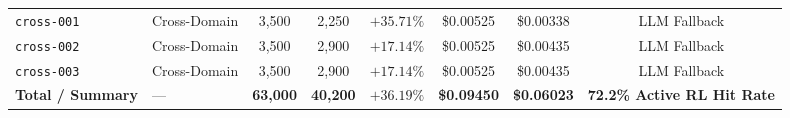 \begin{table}[!t]
\begin{tabular}{llcccccc}
\texttt{cross-001} & Cross-Domain & 3,500 & 2,250 & $+35.71\%$ & \$0.00525 & \$0.00338 & LLM Fallback \\
\texttt{cross-002} & Cross-Domain & 3,500 & 2,900 & $+17.14\%$ & \$0.00525 & \$0.00435 & LLM Fallback \\
\texttt{cross-003} & Cross-Domain & 3,500 & 2,900 & $+17.14\%$ & \$0.00525 & \$0.00435 & LLM Fallback \\
\midrule
\textbf{Total / Summary} & --- & \textbf{63,000} & \textbf{40,200} & $\mathbf{+36.19\%}$ & \textbf{\$0.09450} & \textbf{\$0.06023} & \textbf{72.2\% Active RL Hit Rate} \\
\bottomrule
\end{tabular}
\end{table}
